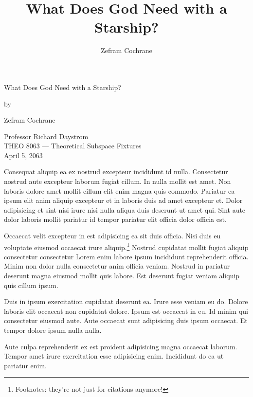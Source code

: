 \documentclass[
    12pt,
    letterpaper,
    oneside,
    noraggedright
]{turabian-researchpaper}
\title{What Does God Need with a Starship?}
\author{Zefram Cochrane}
\begin{document}
    \begin{center}

    \thispagestyle{empty}
    \vspace*{1in}
    \begin{singlespace}
        What Does God Need with a Starship?
        \end{singlespace}
    \vspace{2in - \baselineskip}

    by
    \vspace{2in - \baselineskip}

    Zefram Cochrane

    \vspace{2in - \baselineskip}

    \begin{singlespace}
        Professor Richard Daystrom \\
        THEO 8063 --- Theoretical Subspace Fixtures \\
        April 5, 2063
    \end{singlespace}
    \end{center}
    \newpage
    \setcounter{page}{1}

Consequat aliquip ea ex nostrud excepteur incididunt id nulla.
Consectetur nostrud aute excepteur laborum fugiat cillum. In nulla
mollit est amet. Non laboris dolore amet mollit cillum elit enim magna
quis commodo. Pariatur ea ipsum elit anim aliquip excepteur et in
laboris duis ad amet excepteur et. Dolor adipisicing et sint nisi irure
nisi nulla aliqua duis deserunt ut amet qui. Sint aute dolor laboris
mollit pariatur id tempor pariatur elit officia dolor officia est.

Occaecat velit excepteur in est adipisicing ea sit duis officia. Nisi
duis eu voluptate eiusmod occaecat irure aliquip.\footnote{Footnotes:
  they're not just for citations anymore!} Nostrud cupidatat mollit
fugiat aliquip consectetur consectetur Lorem enim labore ipsum
incididunt reprehenderit officia. Minim non dolor nulla consectetur anim
officia veniam. Nostrud in pariatur deserunt magna eiusmod mollit quis
labore. Est deserunt fugiat veniam aliquip quis cillum ipsum.

Duis in ipsum exercitation cupidatat deserunt ea. Irure esse veniam eu
do. Dolore laboris elit occaecat non cupidatat dolore. Ipsum est
occaecat in eu. Id minim qui consectetur eiusmod aute. Aute occaecat
sunt adipisicing duis ipsum occaecat. Et tempor dolore ipsum nulla
nulla.

Aute culpa reprehenderit ex est proident adipisicing magna occaecat
laborum. Tempor amet irure exercitation esse adipisicing enim.
Incididunt do ea ut pariatur enim.
\end{document}
